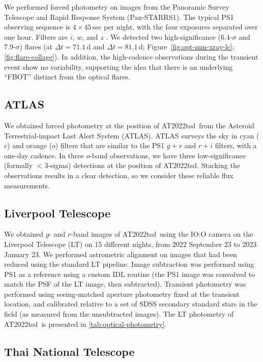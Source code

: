 \documentclass{nature_plusfigure}
\newcommand{\at}{AT2022tsd}
\begin{document}
\begin{methods}
We performed forced photometry on images from the Panoramic Survey Telescope and Rapid Response System (Pan-STARRS1\cite{Chambers2016}).
The typical PS1 observing sequence is $4\times45$\,sec per night, with the
four exposures separated over one hour. Filters are $i$, $w$, and $z$ \cite{Tonry2012}.
We detected two high-significance (6.4-$\sigma$ and 7.9-$\sigma$) flares (at $\Delta t=71.1$\,d and $\Delta t=81.1\,$d; Figure~\ref{fig:opt-mm-xray-lc}; \ref{fig:flare-collage}).
In addition, the high-cadence observations during the transient event show no variability, supporting the idea that there is an underlying ``FBOT'' distinct from the optical flares.

\subsection{ATLAS}
\label{sec:atlas}

We obtained forced photometry at the position of \at\ from the Asteroid Terrestrial-impact Last Alert System (ATLAS\cite{Tonry2018,Smith2020,Shingles2021}).
ATLAS surveys the sky in cyan ($c$) and orange ($o$) filters that are similar to the PS1 $g+r$ and $r+i$ filters,
with a one-day cadence.
In three $o$-band observations, we have three low-significance (formally $<3$-sigma) detections at the position of \at.
Stacking the observations results in a clear detection, so we consider these reliable flux measurements.

\subsection{Liverpool Telescope}
\label{Methods: LT}

We obtained $g$- and $r$-band images of \at\ using the IO:O camera on the Liverpool Telescope\cite{Steele2004} (LT) on 15 different nights, from 2022 September 23 to 2023 January 23. We performed astrometric alignment on images that had been reduced using the standard LT pipeline.  Image subtraction was performed using PS1 as a reference using a custom IDL routine (the PS1 image was convolved to match the PSF of the LT image, then subtracted).  Transient photometry was performed using seeing-matched aperture photometry fixed at the transient location, and calibrated relative to a set of SDSS secondary standard stars in the field (as measured from the unsubtracted images). The LT photometry of \at\ is presented in \ref{tab:optical-photometry}.

\subsection{Thai National Telescope}


\end{methods}
\end{document}
